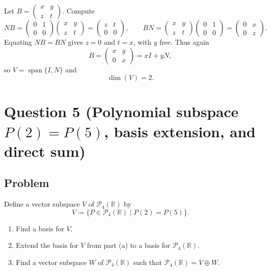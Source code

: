 \documentclass[12pt]{article}
\newcommand{\R}{\mathbb{R}}
\newcommand{\Span}{\operatorname{span}}
\newcommand{\dimn}{\operatorname{dim}}
\newcommand{\Pfour}{\mathcal{P}_4(\R)}
\begin{document}
Let \(B=\begin{pmatrix}x&y\\z&t\end{pmatrix}\).
Compute
\[
NB=
\begin{pmatrix}
0&1\\0&0
\end{pmatrix}
\begin{pmatrix}
x&y\\z&t
\end{pmatrix}
=
\begin{pmatrix}
z&t\\0&0
\end{pmatrix},
\qquad
BN=
\begin{pmatrix}
x&y\\z&t
\end{pmatrix}
\begin{pmatrix}
0&1\\0&0
\end{pmatrix}
=
\begin{pmatrix}
0&x\\0&z
\end{pmatrix}.
\]
Equating \(NB=BN\) gives \(z=0\) and \(t=x\), with \(y\) free.
Thus again
\[
B=
\begin{pmatrix}
x&y\\0&x
\end{pmatrix}
= xI+yN,
\]
so \(V=\Span\{I,N\}\) and
\[
\boxed{\,\dimn(V)=2.\,}
\]

\newpage
\section{Question 5 (Polynomial subspace \(P(2)=P(5)\), basis extension, and direct sum)}
\subsection{Problem}
Define a vector subspace \(V\) of \(\Pfour\) by
\[
V \coloneqq \{P\in \Pfour \mid P(2)=P(5)\}.
\]
\begin{enumerate}[label=(\alph*)]
\item Find a basis for \(V\).
\item Extend the basis for \(V\) from part (a) to a basis for \(\Pfour\).
\item Find a vector subspace \(W\) of \(\Pfour\) such that \(\Pfour = V \oplus W\).
\end{enumerate}
\end{document}
